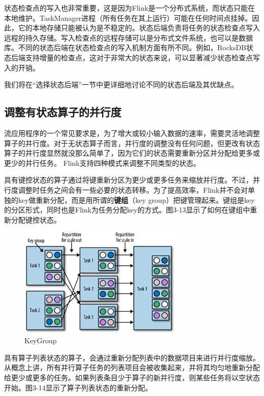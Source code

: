 \documentclass[cn,11pt,chinese]{elegantbook}
\begin{document}
状态检查点的写入也非常重要，这是因为Flink是一个分布式系统，而状态只能在本地维护。TaskManager进程（所有任务在其上运行）可能在任何时间点挂掉。因此，它的本地存储只能被认为是不稳定的。状态后端负责将任务的状态检查点写入远程的持久存储。写入检查点的远程存储可以是分布式文件系统，也可以是数据库。不同的状态后端在状态检查点的写入机制方面有所不同。例如，RocksDB状态后端支持增量的检查点，这对于非常大的状态来说，可以显著减少状态检查点写入的开销。

我们将在“选择状态后端”一节中更详细地讨论不同的状态后端及其优缺点。

\subsection{调整有状态算子的并行度}

流应用程序的一个常见要求是，为了增大或较小输入数据的速率，需要灵活地调整算子的并行度。对于无状态算子而言，并行度的调整没有任何问题，但更改有状态算子的并行度显然就没那么简单了，因为它们的状态需要重新分区并分配给更多或更少的并行任务。
Flink支持四种模式来调整不同类型的状态。

具有键控状态的算子通过将键重新分区为更少或更多任务来缩放并行度。不过，并行度调整时任务之间会有一些必要的状态转移。为了提高效率，Flink并不会对单独的key做重新分配，而是用所谓的\textbf{键组}（key group）把键管理起来。键组是key的分区形式，同时也是Flink为任务分配key的方式。图3-13显示了如何在键组中重新分配键控状态。

\begin{figure}[htbp]
    \centering
    \includegraphics[width=0.7\textwidth]{images/spaf_0313.png}
    \caption{KeyGroup}
\end{figure}

具有算子列表状态的算子，会通过重新分配列表中的数据项目来进行并行度缩放。从概念上讲，所有并行算子任务的列表项目会被收集起来，并将其均匀地重新分配给更少或更多的任务。如果列表条目少于算子的新并行度，则某些任务将以空状态开始。图3-14显示了算子列表状态的重新分配。
\end{document}
